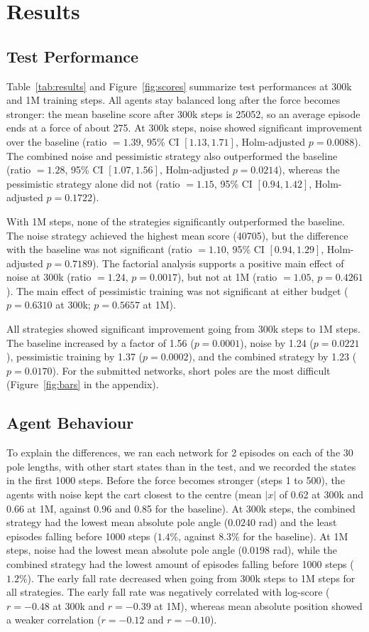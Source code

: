 \documentclass[sigconf]{acmart}
\begin{document}
\section{Results}

\subsection{Test Performance}
Table~\ref{tab:results} and Figure~\ref{fig:scores} summarize test performances at 300k and 1M training steps. All agents stay balanced long after the force becomes stronger: the mean baseline score after 300k steps is 25052, so an average episode ends at a force of about 275. At 300k steps, noise showed significant improvement over the baseline (ratio $=1.39$, 95\% CI $[1.13,1.71]$,
Holm-adjusted $p=0.0088$). The combined noise and pessimistic strategy also outperformed the baseline (ratio $=1.28$, 95\% CI $[1.07,1.56]$, Holm-adjusted $p=0.0214$), whereas the pessimistic strategy alone did not (ratio $=1.15$, 95\% CI $[0.94,1.42]$,
Holm-adjusted $p=0.1722$).

With 1M steps, none of the strategies significantly outperformed the baseline. The noise strategy achieved the highest mean score (40705), but the difference with the baseline was not significant (ratio $=1.10$, 95\% CI $[0.94,1.29]$, Holm-adjusted $p=0.7189$). The factorial analysis supports a positive main
effect of noise at 300k (ratio $=1.24$, $p=0.0017$), but
not at 1M (ratio $=1.05$, $p=0.4261$). The main effect of
pessimistic training was not significant at either budget
($p=0.6310$ at 300k; $p=0.5657$ at 1M).

All strategies showed significant improvement going from 300k steps to 1M steps. The baseline increased by a factor of 1.56 ($p=0.0001$), noise by 1.24 ($p=0.0221$), pessimistic training by 1.37 ($p=0.0002$), and the combined strategy by 1.23 ($p=0.0170$). For the submitted networks, short poles are the most difficult (Figure~\ref{fig:bars} in the appendix).

\subsection{Agent Behaviour}

To explain the differences, we ran each network for 2 episodes on each of the 30 pole lengths, with other start states than in the test, and we recorded the states in the first 1000 steps. Before the force becomes stronger (steps 1 to 500), the agents with noise kept the cart closest to the centre (mean $|x|$ of 0.62 at 300k and 0.66 at 1M, against 0.96 and 0.85 for the baseline). At 300k steps, the combined strategy had the lowest mean absolute pole angle ($0.0240$ rad) and the least episodes falling before 1000 steps ($1.4\%$, against $8.3\%$ for the baseline). At 1M steps, noise had the lowest mean absolute pole angle ($0.0198$ rad), while the combined strategy had the lowest amount of episodes falling before 1000 steps ($1.2\%$). The early fall rate decreased when going from 300k steps to 1M steps for all strategies. The early fall rate was negatively correlated with log-score ($r=-0.48$ at 300k and $r=-0.39$ at 1M), whereas mean absolute position showed a weaker correlation ($r=-0.12$ and $r=-0.10$).
\end{document}
